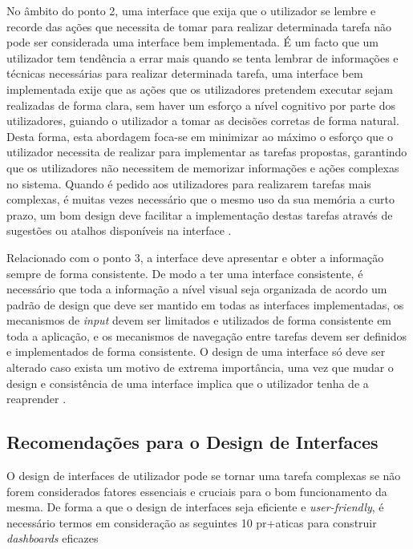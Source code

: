 No âmbito do ponto 2, uma interface que exija que o utilizador se lembre e recorde das ações que necessita de tomar para realizar determinada tarefa não pode ser considerada uma interface bem implementada. É um facto que um utilizador tem tendência a errar mais quando se tenta lembrar de informações e técnicas necessárias para realizar determinada tarefa, uma interface bem implementada exije que as ações que os utilizadores pretendem executar sejam realizadas de forma clara, sem haver um esforço a nível cognitivo por parte dos utilizadores, guiando o utilizador a tomar as decisões corretas de forma natural. Desta forma, esta abordagem foca-se em minimizar ao máximo o esforço que o utilizador necessita de realizar para implementar as tarefas propostas, garantindo que os utilizadores não necessitem de memorizar informações e ações complexas no sistema. Quando é pedido aos utilizadores para realizarem tarefas mais complexas, é muitas vezes necessário que o mesmo uso da sua memória a curto prazo, um bom design deve facilitar a implementação destas tarefas através de sugestões ou atalhos disponíveis na interface \cite{sridevi2014user}.

Relacionado com o ponto 3, a interface deve apresentar e obter a informação sempre de forma consistente. De modo a ter uma interface consistente, é necessário que toda a informação a nível visual seja organizada de acordo um padrão de design que deve ser mantido em todas as interfaces implementadas, os mecanismos de \textit{input} devem ser limitados e utilizados de forma consistente em toda a aplicação, e os mecanismos de navegação entre tarefas devem ser definidos e implementados de forma consistente. O design de uma interface só deve ser alterado caso exista um motivo de extrema importância, uma vez que mudar o design e consistência de uma interface implica que o utilizador tenha de a reaprender \cite{sridevi2014user}.

\subsection{Recomendações para o Design de Interfaces} %
\label{sub:recomendacoes}

O design de interfaces de utilizador pode se tornar uma tarefa complexas se não forem considerados fatores essenciais e cruciais para o bom funcionamento da mesma. De forma a que o design de interfaces seja eficiente e \textit{user-friendly}, é necessário termos em consideração as seguintes 10 pr+aticas para construir \textit{dashboards} eficazes

